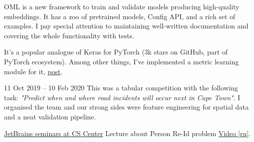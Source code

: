 
OML is a new framework to train and validate models producing high-quality embeddings.
It has a zoo of pretrained models, Config API, and a rich set of examples.
I pay special attention to maintaining well-written documentation and
covering the whole functionality with tests.

\smallskip
\smallskip

It's a popular analogue of Keras for PyTorch (3k stars on GitHub, part of PyTorch ecosystem).
Among other things, I've implemented a metric learning module for it,
\href{https://medium.com/pytorch/metric-learning-with-catalyst-8c8337dfab1a}{\underline{post}}.

\divider

{11 Oct 2019 -- 10 Feb 2020}{}
This was a tabular competition with the following task: \textit{"Predict when and where road incidents will occur next in Cape Town"}. 
I organised the team and our strong sides were feature engineering for spatial data and a neat validation pipeline.
\smallskip

\divider

\cvevent
{\href{https://research.jetbrains.org/groups/plt_lab/seminars}{JetBrains seminars at CS Center}}
{Lecture about Person Re-Id problem}
{}
{}
{\href{https://youtu.be/O8qtBYeOSKE}{\underline{Video} [ru]}.}
